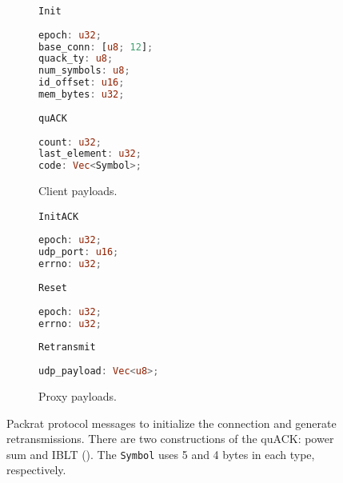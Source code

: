 \begin{figure}[t]
    \begin{subfigure}[b]{0.48\linewidth}
        \begin{protopayload}{\texttt{Init}}
            \begin{lstlisting}[language=Rust]
epoch: u32;
base_conn: [u8; 12];
quack_ty: u8;
num_symbols: u8;
id_offset: u16;
mem_bytes: u32;
            \end{lstlisting}
        \end{protopayload}
        \begin{protopayload}{\texttt{quACK}}
            \begin{lstlisting}[language=Rust]
count: u32;
last_element: u32;
code: Vec<Symbol>;
            \end{lstlisting}
        \end{protopayload}
        \caption{Client payloads.}
        \label{fig:packrat:payloads:client}
    \end{subfigure}
    \hfill
    \begin{subfigure}[b]{0.48\linewidth}
        \begin{protopayload}{\texttt{InitACK}}
            \begin{lstlisting}[language=Rust]
epoch: u32;
udp_port: u16;
errno: u32;
            \end{lstlisting}
        \end{protopayload}
        \begin{protopayload}{\texttt{Reset}}
            \begin{lstlisting}[language=Rust]
epoch: u32;
errno: u32;
            \end{lstlisting}
        \end{protopayload}
        \begin{protopayload}{\texttt{Retransmit}}
            \begin{lstlisting}[language=Rust]
udp_payload: Vec<u8>;
            \end{lstlisting}
        \end{protopayload}
        \caption{Proxy payloads.}
        \label{fig:packrat:payloads:proxy}
    \end{subfigure}
  \caption{Packrat protocol messages to initialize the connection and generate
   retransmissions. There are two constructions of the quACK: power sum and
   IBLT (). The \texttt{Symbol} uses 5 and 4 bytes in each
   type, respectively.}
  \label{fig:packrat:payloads}
\end{figure}
